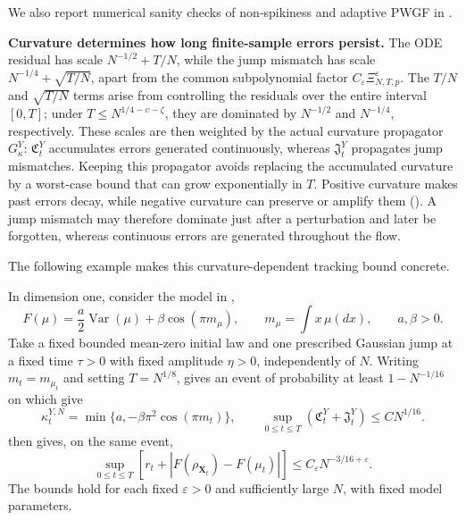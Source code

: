 We also report numerical sanity checks of non-spikiness and adaptive PWGF in .

\noindent\textbf{Curvature determines how long finite-sample errors persist.}
The ODE residual has scale \(N^{-1/2}+T/N\), while the jump mismatch has scale
\(N^{-1/4}+\sqrt{T/N}\), apart from the common subpolynomial factor
\(C_\varepsilon\Xi_{N,T,p}^{\varepsilon}\). The \(T/N\) and
\(\sqrt{T/N}\) terms arise from controlling the residuals over the entire
interval \([0,T]\); under
\(T\le N^{1/4-\upsilon-\zeta}\), they are dominated by \(N^{-1/2}\) and \(N^{-1/4}\),
respectively. These scales are then weighted by the actual curvature
propagator \(G_\kappa^Y\): \(\mathfrak C_t^Y\) accumulates errors generated
continuously, whereas \(\mathfrak J_t^Y\) propagates jump mismatches. Keeping this
propagator avoids replacing the accumulated curvature by a worst-case bound
that can grow exponentially in \(T\). Positive curvature makes past errors
decay, while negative curvature can preserve or amplify them
(). A jump mismatch may therefore dominate just
after a perturbation and later be forgotten, whereas continuous errors are
generated throughout the flow.

The following example makes this curvature-dependent tracking bound concrete.

\begin{example}
\label{ex:variance-cosine-curvature-recovery}
In dimension one, consider the model in ,
\[
 F(\mu)=\frac a2\operatorname{Var}(\mu)+\beta\cos(\pi m_\mu),
 \qquad m_\mu=\int x\,\mu(dx),\qquad a,\beta>0.
\]
Take a fixed bounded mean-zero initial law and one prescribed Gaussian jump
at a fixed time $\tau>0$ with fixed amplitude $\eta>0$, independently of $N$.
Writing $m_t=m_{\mu_t}$ and setting $T=N^{1/8}$,
 gives an event of probability at least
$1-N^{-1/16}$ on which
 give
\[
 \kappa_t^{Y,N}=\min\{a,-\beta\pi^2\cos(\pi m_t)\},
 \qquad
 \sup_{0\le t\le T}(\mathfrak C_t^Y+\mathfrak J_t^Y)\le CN^{1/16}.
\]
 then gives, on the same event,
\[
 \sup_{0\le t\le T}
 \left[r_t+\left|F(\rho_{\mathbf X_t})-F(\mu_t)\right|\right]
 \le C_\varepsilon N^{-3/16+\varepsilon}.
\]
The bounds hold for each fixed $\varepsilon>0$ and sufficiently large $N$,
with fixed model parameters.
\end{example}

